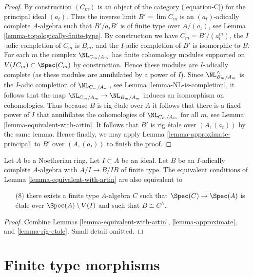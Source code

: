 \begin{proof}
\medskip\noindent
By construction $(C_m)$ is an object of the category
(\ref{equation-C}) for the principal ideal $(a_t)$.
Thus the inverse limit $B' = \lim C_m$ is an $(a_t)$-adically
complete $A$-algebra such that $B'/a_t B'$ is of finite type
over $A/(a_t)$, see Lemma \ref{lemma-topologically-finite-type}.
By construction we have $C_m = B'/(a_t^m)$, the $I$-adic
completion of $C_m$ is $B_m$, and the $I$-adic completion of
$B'$ is isomorphic to $B$.
For each $m$ the complex $\NL_{C_m/A_m}$ has finite cohomology
modules supported on $V(IC_m) \subset \Spec(C_m)$ by construction.
Hence these modules are $I$-adically complete (as these modules
are annihilated by a power of $I$). Since $\NL^\wedge_{B_m/A_m}$
is the $I$-adic completion of $\NL_{C_m/A_m}$, see
Lemma \ref{lemma-NL-is-completion}, it
follows that the map $\NL_{C_m/A_m} \to \NL_{B_m/A_m}$ induces
an isomorphism on cohomologies. Thus because $B$ is rig \'etale
over $A$ it follows that there is a fixed power of $I$ that annihilates
the cohomologies of $\NL_{C_m/A_m}$ for all $m$, see
Lemma \ref{lemma-equivalent-with-artin}. It follows that $B'$
is rig \'etale over $(A, (a_t))$ by the same lemma.
Hence finally, we may apply Lemma \ref{lemma-approximate-principal}
to $B'$ over $(A, (a_t))$ to finish the proof.
\end{proof}

\begin{lemma}
\label{lemma-approximate-by-etale-over-complement}
Let $A$ be a Noetherian ring. Let $I \subset A$ be an ideal.
Let $B$ be an $I$-adically complete $A$-algebra with $A/I \to B/IB$
of finite type. The equivalent conditions of
Lemma \ref{lemma-equivalent-with-artin} are also equivalent to
\begin{enumerate}
\item[(8)]
\label{item-algebraize}
there exists a finite type $A$-algebra $C$ such that
$\Spec(C) \to \Spec(A)$ is \'etale over $\Spec(A) \setminus V(I)$
and such that $B \cong C^\wedge$.
\end{enumerate}
\end{lemma}

\begin{proof}
Combine Lemmas \ref{lemma-equivalent-with-artin}, \ref{lemma-approximate}, and
\ref{lemma-rig-etale}. Small detail omitted.
\end{proof}




\section{Finite type morphisms}
\label{section-finite-type}

